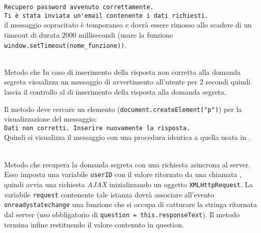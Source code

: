 \begin{description}
	\verb|Recupero password avvenuto correttamente.|\\
	\verb|Ti è stata inviata un'email contenente i dati richiesti.|\\
	
il messaggio sopracitato è temporaneo e dovrà essere rimosso allo scadere di un timeout di durata 2000 millisecondi (usare la funzione \texttt{window.setTimeout(nome\_funzione))}.
	
	\item{}\\
	Metodo che In caso di inserimento della risposta non corretta alla domanda segreta visualizza un messaggio di avvertimento all'utente per 2 secondi quindi lascia il controllo al  di inserimento della risposta alla domanda segreta.
	
	Il metodo deve cercare un elemento (\texttt{document.createElement("p")}) per la visualizzazione del messaggio:\\
	
	\verb|Dati non corretti. Inserire nuovamente la risposta.|\\
	
	Quindi si visualizza il messaggio con una procedura identica a quella usata in .
		
	\item{}\\
	Metodo che recupera la domanda segreta con una richiesta asincrona al server. Esso imposta una variabile \texttt{userID} con il valore ritornato da una chiamata , quindi avvia una richiesta \textit{AJAX} inizializzando un oggetto \texttt{XMLHttpRequest}. La variabile \texttt{request} contenente tale istanza dovrà associare all'evento \texttt{onreadystatechange} una funzione che si occupa di catturare la stringa ritornata dal server (uso obbligatorio di \texttt{question = this.responseText}). Il metodo termina infine restituendo il valore contenuto in question.
	

\end{description}
